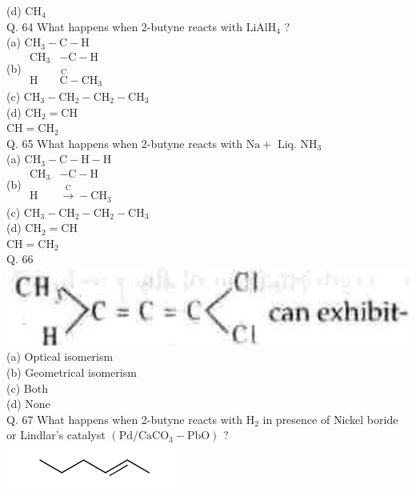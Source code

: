 \documentclass[10pt]{article}
\begin{document}
(d) $\mathrm{CH}_{4}$\\
Q. 64 What happens when 2-butyne reacts with $\mathrm{LiAlH}_{4}$ ?\\
(a) $\mathrm{CH}_{3}-\mathrm{C}-\mathrm{H}$\\
(b) $\begin{aligned} \mathrm{CH}_{3} & -\mathrm{C}-\mathrm{H} \\ \mathrm{H} & \stackrel{\mathrm{C}}{\mathrm{C}}-\mathrm{CH}_{3}\end{aligned}$\\
(c) $\mathrm{CH}_{3}-\mathrm{CH}_{2}-\mathrm{CH}_{2}-\mathrm{CH}_{3}$\\
(d) $\mathrm{CH}_{2}=\mathrm{CH}$\\
$\mathrm{CH}=\mathrm{CH}_{2}$\\
Q. 65 What happens when 2-butyne reacts with $\mathrm{Na}+$ Liq. $\mathrm{NH}_{3}$\\
(a) $\mathrm{CH}_{3}-\mathrm{C}-\mathrm{H}-\mathrm{H}$\\
(b) $\begin{aligned} \mathrm{CH}_{3} & -\mathrm{C}-\mathrm{H} \\ \mathrm{H} & \xrightarrow{\mathrm{C}}-\mathrm{CH}_{3}\end{aligned}$\\
(c) $\mathrm{CH}_{3}-\mathrm{CH}_{2}-\mathrm{CH}_{2}-\mathrm{CH}_{3}$\\
(d) $\mathrm{CH}_{2}=\mathrm{CH}$\\
$\mathrm{CH}=\mathrm{CH}_{2}$\\
Q. 66\\
\includegraphics[max width=\textwidth, center]{2025_01_28_8470952b98110cec3aabg-234}\\
(a) Optical isomerism\\
(b) Geometrical isomerism\\
(c) Both\\
(d) None\\
Q. 67 What happens when 2-butyne reacts with $\mathrm{H}_{2}$ in presence of Nickel boride or Lindlar's catalyst $\left(\mathrm{Pd} / \mathrm{CaCO}_{3}-\mathrm{PbO}\right)$ ?\\
\includegraphics{smile-4441e4e376184750a63fc44f8b0b0958712e0c0d}\\
\end{document}
